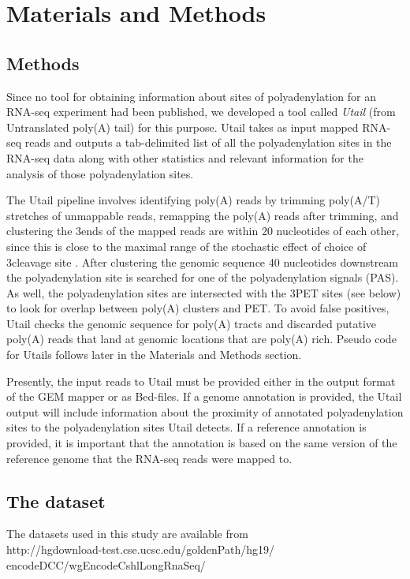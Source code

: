 \section{Materials and Methods}
\subsection{Methods}
Since no tool for obtaining information about sites of polyadenylation for an
RNA-seq experiment had been published, we developed a tool called
\textit{Utail} (from Untranslated poly(A) tail) for this purpose. Utail takes
as input mapped RNA-seq reads and outputs a tab-delimited list of all the
polyadenylation sites in the RNA-seq data along with other statistics and
relevant information for the analysis of those polyadenylation sites.

The Utail pipeline involves identifying poly(A) reads by trimming poly(A/T)
stretches of unmappable reads, remapping the poly(A) reads after trimming, and
clustering the 3\ppp ends of the mapped reads are within 20 nucleotides of each
other, since this is close to the maximal range of the stochastic effect of
choice of 3\ppp cleavage site \cite{tian_large-scale_2005}. After clustering
the genomic sequence 40 nucleotides downstream the polyadenylation site is
searched for one of the polyadenylation signals (PAS). As well, the
polyadenylation sites are intersected with the 3\ppp PET sites (see below) to
look for overlap between poly(A) clusters and PET. To avoid false positives,
Utail checks the genomic sequence for poly(A) tracts and discarded putative
poly(A) reads that land at genomic locations that are poly(A) rich. Pseudo code
for Utails follows later in the Materials and Methods section.

Presently, the input reads to Utail must be provided either in the output
format of the GEM mapper \cite{marco-sola_gem_2012} or as Bed-files. If a
genome annotation is provided, the Utail output will include information about
the proximity of annotated polyadenylation sites to the polyadenylation sites
Utail detects. If a reference annotation is provided, it is important that the
annotation is based on the same version of the reference genome that the
RNA-seq reads were mapped to.

\subsection{The dataset}
The datasets used in this study are available from \\
http://hgdownload-test.cse.ucsc.edu/goldenPath/hg19/\\
encodeDCC/wgEncodeCshlLongRnaSeq/

